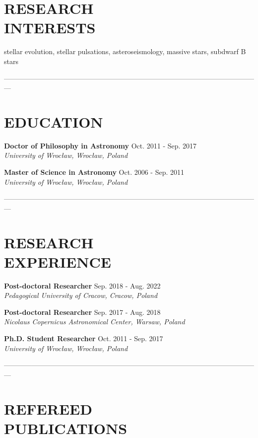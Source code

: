 \documentclass[margin, 10pt]{res} %
\begin{document}
\begin{resume}

\section{RESEARCH \\ INTERESTS}  

stellar evolution, stellar pulsations, asteroseismology, massive stars, subdwarf B stars

---------------------------------------------------------------------------------------------------------------

\section{EDUCATION}

{\bf Doctor of Philosophy in Astronomy}  \hfill Oct. 2011 - Sep. 2017 \\
{\sl University of Wroc\l{}aw, Wroc\l{}aw, Poland}

{\bf Master of Science in Astronomy}  \hfill Oct. 2006 - Sep. 2011 \\
{\sl University of Wroc\l{}aw, Wroc\l{}aw, Poland}

---------------------------------------------------------------------------------------------------------------

\section{RESEARCH \\ EXPERIENCE}  

{\bf Post-doctoral Researcher}  \hfill Sep. 2018 - Aug. 2022 \\
{\sl Pedagogical University of Cracow, Cracow, Poland}

{\bf Post-doctoral Researcher}  \hfill Sep. 2017 - Aug. 2018 \\
{\sl Nicolaus Copernicus Astronomical Center, Warsaw, Poland}

{\bf Ph.D. Student Researcher}  \hfill Oct. 2011 - Sep. 2017 \\
{\sl University of Wroc\l{}aw, Wroc\l{}aw, Poland}

---------------------------------------------------------------------------------------------------------------

\section{REFEREED \\ PUBLICATIONS} 


\end{resume}
\end{document}
